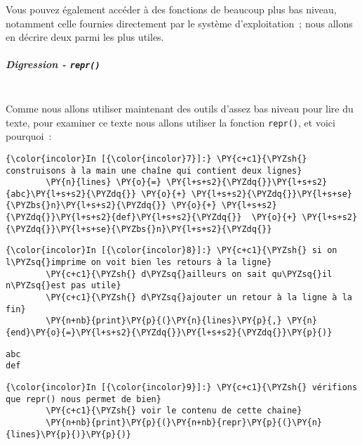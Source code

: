     Vous pouvez également accéder à des fonctions de beaucoup plus bas
niveau, notamment celle fournies directement par le système
d'exploitation~; nous allons en décrire deux parmi les plus utiles.

    \hypertarget{digression---repr}{%
\subparagraph{\texorpdfstring{Digression -
\texttt{repr()}}{Digression - repr()}\\\\}\label{digression---repr}}

    Comme nous allons utiliser maintenant des outils d'assez bas niveau pour
lire du texte, pour examiner ce texte nous allons utiliser la fonction
\texttt{repr()}, et voici pourquoi~:

    \begin{Verbatim}[commandchars=\\\{\}]
{\color{incolor}In [{\color{incolor}7}]:} \PY{c+c1}{\PYZsh{} construisons à la main une chaîne qui contient deux lignes}
        \PY{n}{lines} \PY{o}{=} \PY{l+s+s2}{\PYZdq{}}\PY{l+s+s2}{abc}\PY{l+s+s2}{\PYZdq{}} \PY{o}{+} \PY{l+s+s2}{\PYZdq{}}\PY{l+s+se}{\PYZbs{}n}\PY{l+s+s2}{\PYZdq{}} \PY{o}{+} \PY{l+s+s2}{\PYZdq{}}\PY{l+s+s2}{def}\PY{l+s+s2}{\PYZdq{}}  \PY{o}{+} \PY{l+s+s2}{\PYZdq{}}\PY{l+s+se}{\PYZbs{}n}\PY{l+s+s2}{\PYZdq{}}
\end{Verbatim}


    \begin{Verbatim}[commandchars=\\\{\}]
{\color{incolor}In [{\color{incolor}8}]:} \PY{c+c1}{\PYZsh{} si on l\PYZsq{}imprime on voit bien les retours à la ligne}
        \PY{c+c1}{\PYZsh{} d\PYZsq{}ailleurs on sait qu\PYZsq{}il n\PYZsq{}est pas utile}
        \PY{c+c1}{\PYZsh{} d\PYZsq{}ajouter un retour à la ligne à la fin}
        \PY{n+nb}{print}\PY{p}{(}\PY{n}{lines}\PY{p}{,} \PY{n}{end}\PY{o}{=}\PY{l+s+s2}{\PYZdq{}}\PY{l+s+s2}{\PYZdq{}}\PY{p}{)}
\end{Verbatim}


    \begin{Verbatim}[commandchars=\\\{\}]
abc
def

    \end{Verbatim}

    \begin{Verbatim}[commandchars=\\\{\}]
{\color{incolor}In [{\color{incolor}9}]:} \PY{c+c1}{\PYZsh{} vérifions que repr() nous permet de bien}
        \PY{c+c1}{\PYZsh{} voir le contenu de cette chaine}
        \PY{n+nb}{print}\PY{p}{(}\PY{n+nb}{repr}\PY{p}{(}\PY{n}{lines}\PY{p}{)}\PY{p}{)}
\end{Verbatim}


